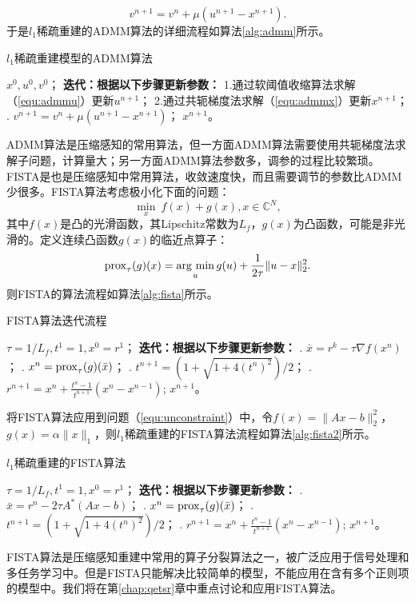 \begin{equation}
	v^{n+1}=v^{n}+\mu(u^{n+1}-x^{n+1}).
\end{equation}
于是$l_1$稀疏重建的ADMM算法的详细流程如算法\ref{alg:admm}所示。
\begin{algorithm}
	\caption{$l_1$稀疏重建模型的ADMM算法}
	\label{alg:admm}
	\begin{algorithmic}
		\REQUIRE $x^0, u^0, v^0$；
		\INDSTATE[-1.25] \textbf{迭代：根据以下步骤更新参数：}	
		\STATE 1.通过软阈值收缩算法求解（\ref{equ:admmu}）更新$u^{n+1}$；
		\STATE 2.通过共轭梯度法求解（\ref{equ:admmx}）更新$x^{n+1}$；
		. $v^{n+1}=v^{n}+\mu(u^{n+1}-x^{n+1})$；
		\ENSURE $x^{n+1}$。
	\end{algorithmic}
\end{algorithm}

ADMM算法是压缩感知的常用算法，但一方面ADMM算法需要使用共轭梯度法求解子问题，计算量大；另一方面ADMM算法参数多，调参的过程比较繁琐。FISTA\cite{fista}是也是压缩感知中常用算法，收敛速度快，而且需要调节的参数比ADMM少很多。FISTA算法考虑极小化下面的问题：
\begin{equation}
	\min_x\ f(x)+g(x),x\in \mathbb{C}^N,
\end{equation}
其中$f(x)$是凸的光滑函数，其Lipschitz常数为$L_f$，$g(x)$为凸函数，可能是非光滑的。定义连续凸函数$g(x)$的临近点算子：
\begin{equation}
	\mathrm{prox}_\tau(g)(x)=\argmin_u g(u)+\frac{1}{2\tau}\|u-x\|^2_2.
\end{equation}
则FISTA的算法流程如算法\ref{alg:fista}所示。
\begin{algorithm}
	\caption{FISTA算法迭代流程}
	\label{alg:fista}
	\begin{algorithmic}
		\REQUIRE $\tau = 1/L_f, t^1=1, x^0=r^1$；
		\INDSTATE[-1.25] \textbf{迭代：根据以下步骤更新参数：}	
		. $\bar{x}=r^k-\tau\nabla f(x^n)$；
		. $x^n=\mathrm{prox}_{\tau}(g)(\bar{x})$；
		. $t^{n+1}=(1+\sqrt{1+4(t^n)^2})/2$；
		. $r^{n+1}=x^n+\frac{t^n-1}{t^{n+1}}(x^n-x^{n-1})$;
		\ENSURE $x^{n+1}$。
	\end{algorithmic}
\end{algorithm}

将FISTA算法应用到问题（\ref{equ:unconstraint}）中，令$f(x)=\|Ax-b\|^2_2$，$g(x)=\alpha\|x\|_1$，则$l_1$稀疏重建的FISTA算法流程如算法\ref{alg:fista2}所示。
\begin{algorithm}
	\caption{$l_1$稀疏重建的FISTA算法}
	\label{alg:fista2}
	\begin{algorithmic}
		\REQUIRE $\tau = 1/L_f, t^1=1, x^0=r^1$；
		\INDSTATE[-1.25] \textbf{迭代：根据以下步骤更新参数：}	
		. $\bar{x}=r^n-2\tau A^*(Ax-b)$；
		. $x^n=\mathrm{prox}_{\tau}(g)(\bar{x})$；
		. $t^{n+1}=(1+\sqrt{1+4(t^n)^2})/2$；
		. $r^{n+1}=x^n+\frac{t^n-1}{t^{n+1}}(x^n-x^{n-1})$;
		\ENSURE $x^{n+1}$。
	\end{algorithmic}
\end{algorithm}
FISTA算法是压缩感知重建中常用的算子分裂算法之一，被广泛应用于信号处理\cite{beck2009fast}和多任务学习\cite{ji2009accelerated}中。但是FISTA只能解决比较简单的模型，不能应用在含有多个正则项的模型中。我们将在第\ref{chap:qetsr}章中重点讨论和应用FISTA算法。

